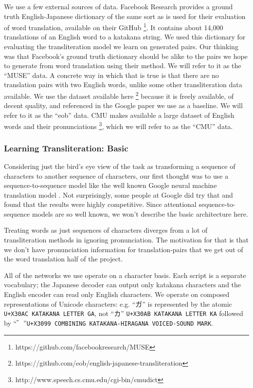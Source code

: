 \documentclass{article}
\begin{document}
We use a few external sources of data.
Facebook Research provides a ground truth English-Japanese dictionary
of the same sort as is used for their evaluation of word translation,
available on their GitHub
\footnote{https://github.com/facebookresearch/MUSE}.
It contains about 14,000 translations of an English word to a katakana string.
We used this dictionary for evaluating the transliteration model
we learn on generated pairs.
Our thinking was that Facebook's ground truth dictionary
should be alike to the pairs we hope to generate from word translation
using their method.
We will refer to it as the ``MUSE'' data.
A concrete way in which that is true is that
there are no translation pairs with two English words,
unlike some other transliteration data available.
We use the dataset available here
\footnote{https://github.com/eob/english-japanese-transliteration}
because it is freely available,
of decent quality,
and referenced in the Google paper\cite{Rosca2016SequencetosequenceNN}
we use as a baseline.
We will refer to it as the ``eob'' data.
CMU makes available a large dataset of English words and their pronunciations
\footnote{http://www.speech.cs.cmu.edu/cgi-bin/cmudict},
which we will refer to as the ``CMU'' data.

\subsubsection*{Learning Transliteration: Basic}

Considering just the bird's eye view of the task
as transforming a sequence of characters to another sequence of characters,
our first thought was to use a sequence-to-sequence model
like the well known Google neural machine translation model
\cite{Wu2016GooglesNM}.
Not surprisingly,
some people at Google did try that \cite{Rosca2016SequencetosequenceNN}
and found that the results were highly competitive.
Since attentional sequence-to-sequence models \cite{Bahdanau2015NeuralMT}
are so well known,
we won't describe the basic architecture here.

Treating words as just sequences of characters
diverges from a lot of transliteration methods
in ignoring pronunciation.
The motivation for that
is that we don't have pronunciation information for translation-pairs
that we get out of the word translation half of the project.

All of the networks we use operate on a character basis.
Each script is a separate vocabulary;
the Japanese decoder can output only katakana characters
and the English encoder can read only English characters.
We operate on composed representations of Unicode characters:
e.g. ``ガ'' is represented by the atomic \texttt{U+X30AC KATAKANA LETTER GA},
not ``カ'' \texttt{U+X30AB KATAKANA LETTER KA} followed by
``゛''\texttt{U+X3099 COMBINING KATAKANA-HIRAGANA VOICED-SOUND MARK}.
\end{document}
